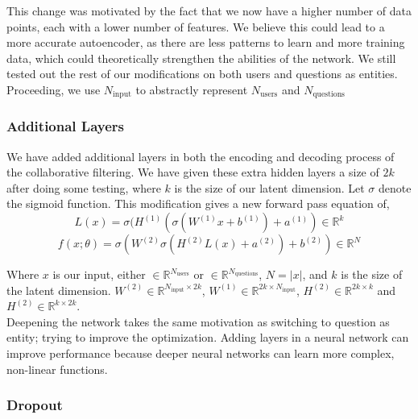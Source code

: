 \documentclass{article}
\begin{document}
\noindent This change was motivated by the fact that we now have a higher number of data points, each with a lower number of features. We believe this could lead to a more accurate autoencoder, as there are less patterns to learn and more training data, which could theoretically strengthen the abilities of the network. We still tested out the rest of our modifications on both users and questions as entities. Proceeding, we use $N_{\text{input}}$ to abstractly represent $N_{\text{users}}$ and $N_{\text{questions}}$
\subsubsection{Additional Layers}
We have added additional layers in both the encoding and decoding process of the collaborative filtering. We have given these extra hidden layers a size of $2k$ after doing some testing, where $k$ is the size of our latent dimension. Let $\sigma$ denote the sigmoid function. This modification gives a new forward pass equation of,
$$L(x) = \sigma(H^{(1)}(\sigma(W^{(1)}x + b^{(1)}) + a^{(1)}) \in \mathbb{R}^{k}$$
$$f(x; \theta) = \sigma(W^{(2)}\sigma(H^{(2)}L(x) + a^{(2)}) + b^{(2)}) \in \mathbb{R}^N$$

\noindent Where $x$ is our input, either $\in \mathbb{R}^{N_{\text{users}}}$ or $\in \mathbb{R}^{N_{\text{questions}}}$, $N = |x|$, and $k$ is the size of the latent dimension. $W^{(2)} \in \mathbb{R}^{N_{\text{input}}\times 2k}$, $W^{(1)} \in \mathbb{R}^{2k\times N_{\text{input}}}$, $H^{(2)} \in \mathbb{R}^{2k\times k}$ and $H^{(2)} \in \mathbb{R}^{k\times 2k}$.\\

\noindent Deepening the network takes the same motivation as switching to question as entity; trying to improve the optimization. Adding layers in a neural network can improve performance because deeper neural networks can learn more complex, non-linear functions.
\subsubsection{Dropout}
\end{document}
